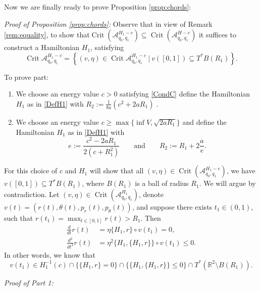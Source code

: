 \documentclass[a4paper]{amsart}
\numberwithin{equation}{section}
\newcommand{\R}{\mathbb{R}}
\newcommand{\A}{\mathcal{A}}
\newcommand{\Crit}{\operatorname{Crit}}
\begin{document}
Now we are finally ready to prove Proposition \ref{prop:chords}:

\vspace*{.5cm}
\noindent \textit{Proof of Proposition \ref{prop:chords}:}
Observe that in view of Remark \ref{rem:equality}, to show that\linebreak $\Crit (\A^{H_1-c}_{q_0,q_1})\subseteq \Crit (\A^{H-c}_{q_0,q_1})$ it suffices to construct a Hamiltonian $H_1$, satisfying 
$$
\Crit \A_{q_0,q_1}^{H_1-c}=\left\lbrace (v,\eta) \in \Crit \A_{q_0,q_1}^{H_1-c} \ \big|\ v([0,1])\subseteq T^*B(R_1) \right\rbrace.
$$

To prove part:
\begin{enumerate}[label=\arabic*.]
\item We choose an energy value $c>0$ satisfying \eqref{CondC} define the Hamiltonian $H_1$ as in \eqref{DefH1} with $R_2:=\frac{1}{8a}(c^2+2aR_1)$ .
\item We choose an energy value $c \geq \max\{\inf V, \sqrt{2aR_1}\}$ and define the Hamiltonian $H_1$ as in \eqref{DefH1} with
\begin{equation}\label{parameters}
e:= \frac{c^2-2aR_1}{2(c+R_1^2)} \qquad \textrm{and} \qquad R_2:=R_1+2\frac{a}{e}.
\end{equation}
\end{enumerate}

For this choice of $c$ and $H_1$ will show that all $(v,\eta) \in \Crit (\A^{H_1-c}_{q_0,q_1})$, we have $v([0,1]) \subseteq T^*B(R_1)$, where $B(R_1)$ is a ball of radius $R_1$. 
We will argue by contradiction. Let $(v,\eta) \in \Crit (\A^{H_1}_{q_0,q_1})$, denote $v(t)=(r(t), \theta(t), p_r(t), p_\theta(t))$, and suppose there exists $t_1 \in (0,1)$, such that $r(t_1)=\max_{t\in [0,1]}r(t)>R_1$. Then
\begin{align*}
\frac{d}{dt} r(t)& =\eta \{H_1, r\}\circ v(t_1) = 0,\\ %
\frac{d^2}{dt^2}r(t) & =\eta^2\{H_1, \{H_1, r\}\}\circ v(t_1) \leq 0.
\end{align*}
In other words, we know that
\begin{equation}\label{v(t1)}
v(t_1)\in H_1^{-1}(c)\cap\{\{H_1,r\}=0\}\cap \{\{H_1,\{H_1,r\}\}\leq 0\}\cap T^*(\R^2\setminus B(R_1)).
\end{equation}

\noindent\textit{Proof of Part 1:}
\end{document}
